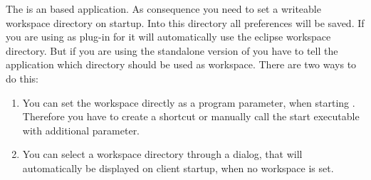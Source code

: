 The \gdclient is an  based application. As consequence you
need to set a writeable 
workspace directory on startup. Into this directory all preferences
will be saved. If you are
 using \gdclient as plug-in for  it will automatically use
 the eclipse workspace directory. 
But if you are using the standalone version of \gdclient you have to
tell the application which directory 
should be used as workspace. There are two ways to do this:
\begin{enumerate}
\item {You can set the workspace directly as a program parameter, when
  starting \gdclient. Therefore you 
have to create a shortcut or manually call the start executable with additional parameter.}
%
\item {You can select a workspace directory through a dialog, that
  will automatically be displayed on 
client startup, when no workspace is set.}
\end{enumerate}